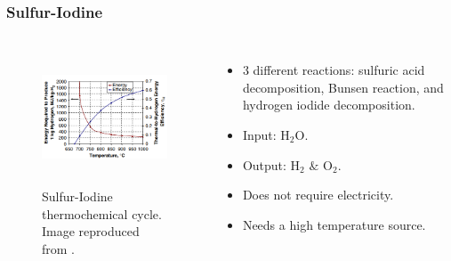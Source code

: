 \begin{frame}
\frametitle{Sulfur-Iodine}
\begin{columns}
    \column[t]{5cm}
   	\begin{figure}[htbp!]
		\begin{center}
			\includegraphics[height=4.0cm]{images/si-energy.png}
		\end{center}
		\caption{Sulfur-Iodine thermochemical cycle. Image reproduced from \cite{nomura_mikihiro_efficient_2004}.}
 	\end{figure}

 	\column[t]{5cm}
 	\begin{itemize}
 		\item 3 different reactions: sulfuric acid decomposition, Bunsen reaction, and hydrogen iodide decomposition.
 		\item Input: H$_2$O.
 		\item Output: H$_2$ $\&$ O$_2$. 
 		\item Does not require electricity.
 		\item Needs a high temperature source.
 	\end{itemize}
\end{columns}
\end{frame}


